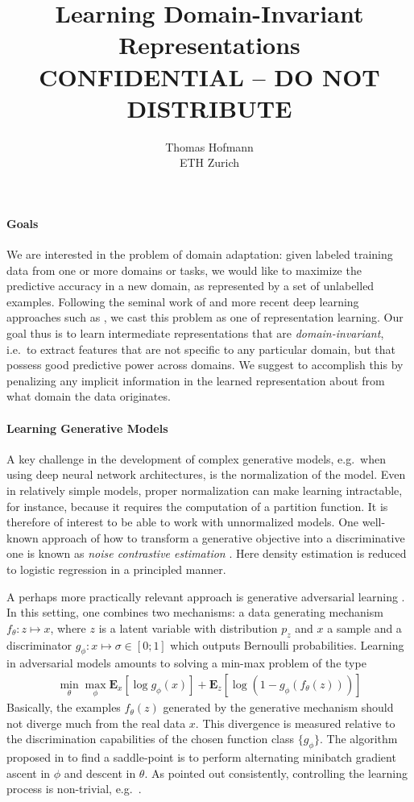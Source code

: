 \documentclass{article}
\title{Learning Domain-Invariant Representations \\ {\small CONFIDENTIAL --  DO NOT DISTRIBUTE}}
\author{Thomas Hofmann\\ ETH Zurich}
\newcommand{\E}{{\mathbf E}}
\begin{document}
\maketitle

\paragraph{Goals}  We are interested in the problem of domain adaptation: given labeled training data from one or more domains or tasks, we would like to maximize the predictive accuracy in a new domain, as represented by a set of unlabelled examples.  Following the seminal work of \cite{ben2007analysis,ben2010theory} and more recent deep learning approaches such as \cite{ganin2016domain}, we cast this problem as one of representation learning. Our goal thus is to learn intermediate representations that are \textit{domain-invariant}, i.e.~to extract features that are not specific to any particular domain, but that possess good predictive power across domains. We suggest to accomplish this by penalizing any implicit information in the learned representation about from what domain the data originates. 

\paragraph{Learning Generative Models} A key challenge in the development of complex generative models, e.g.~when using deep neural network architectures, is the normalization of the model. Even in relatively simple models, proper normalization can make learning intractable, for instance, because it requires the computation of a partition function. It is therefore of interest to be able to work with unnormalized models. One well-known approach of how to transform a generative objective into a discriminative one is known as \textit{noise contrastive estimation} \cite{gutmann2010noise}. Here density estimation is reduced to logistic regression in  a principled manner. 

A perhaps more practically relevant approach is generative adversarial learning \cite{goodfellow2014generative}. In this setting, one combines two mechanisms: a data generating mechanism $f_\theta: z \mapsto x$, where $z$ is a latent variable with distribution $p_z$ and $x$ a sample and a discriminator $g_\phi: x \mapsto \sigma \in [0;1]$ which outputs Bernoulli probabilities. Learning in adversarial models amounts to solving a min-max problem of the type 
\begin{align}
\label{eq:criterion}
\min_\theta \max_\phi \E_x \left[ \log g_\phi(x) \right] + \E_z \left[ \log (1-g_\phi(f_\theta(z))) \right]
\end{align}
Basically, the examples $f_\theta(z)$ generated by the generative mechanism should not diverge much from the real data $x$. This divergence is measured relative to the discrimination capabilities of the chosen function class $\{ g_\phi\}$. The algorithm proposed in \cite{goodfellow2014generative} to find a saddle-point is to perform alternating minibatch gradient ascent in $\phi$ and descent in $\theta$. As pointed out consistently, controlling the learning process is non-trivial, e.g.~\cite[Section 4.1]{li2015generative}. 
\end{document}
